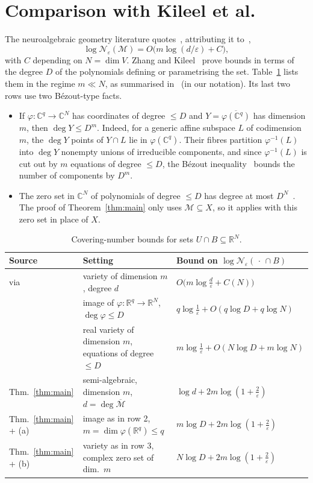 \documentclass[11pt]{article}
\newcommand{\R}{\mathbb{R}}
\newcommand{\C}{\mathbb{C}}
\newcommand{\cM}{\mathcal{M}}
\newcommand{\cN}{\mathcal{N}}
\begin{document}
\section{Comparison with Kileel et al.}

The neuroalgebraic geometry literature quotes~\cite[eq.~(4)]{MSMTK25},
attributing it to~\cite{KTB19},
\[
  \log\cN_\varepsilon(\cM)=O\bigl(m\log(d/\varepsilon)+C\bigr),
\]
with $C$ depending on $N=\dim V$. Zhang and Kileel~\cite{ZK23} prove bounds in
terms of the degree $D$ of the polynomials defining or parametrising the set.
Table~\ref{tab:comparison} lists them in the regime $m\ll N$, as summarised
in~\cite[Table~1]{ZK23} (in our notation). Its last two rows use two
Bézout-type facts.


\begin{itemize}
\item[(a)] If $\varphi\colon\C^q\to\C^N$ has coordinates of degree $\le D$ and
  $Y=\overline{\varphi(\C^q)}$ has dimension $m$, then $\deg Y\le D^m$. Indeed,
  for a generic affine subspace $L$ of codimension $m$, the $\deg Y$ points of
  $Y\cap L$ lie in $\varphi(\C^q)$. Their fibres partition $\varphi^{-1}(L)$
  into $\deg Y$ nonempty unions of irreducible components, and since
  $\varphi^{-1}(L)$ is cut out by $m$ equations of degree $\le D$, the Bézout
  inequality~\cite{He83} bounds the number of components by $D^m$.
\item[(b)] The zero set in $\C^N$ of polynomials of degree $\le D$ has degree
  at most $D^N$~\cite{He83}. The proof of Theorem~\ref{thm:main} only uses
  $\cM\subseteq X$, so it applies with this zero set in place of $X$.
\end{itemize}

\begin{table}[ht]
\centering\small
\renewcommand{\arraystretch}{1.3}
\begin{tabular}{@{}lll@{}}
\toprule
Source & Setting & Bound on $\log\cN_\varepsilon(\,\cdot\,\cap B)$\\
\midrule
\cite{KTB19} via \cite{MSMTK25} & variety of dimension $m$, degree $d$
  & $O\bigl(m\log\frac{d}{\varepsilon}+C(N)\bigr)$\\
\cite{ZK23} & image of $\varphi\colon\R^q\to\R^N$, $\deg\varphi\le D$
  & $q\log\frac1\varepsilon+O(q\log D+q\log N)$\\
\cite{ZK23} & real variety of dimension $m$, equations of degree $\le D$
  & $m\log\frac1\varepsilon+O(N\log D+m\log N)$\\
\midrule
Thm.~\ref{thm:main} & semi-algebraic, dimension $m$, $d=\deg\overline{\cM}$
  & $\log d+2m\log(1+\frac{2}{\varepsilon})$\\
Thm.~\ref{thm:main} + (a) & image as in row 2, $m=\dim\varphi(\R^q)\le q$
  & $m\log D+2m\log(1+\frac{2}{\varepsilon})$\\
Thm.~\ref{thm:main} + (b) & variety as in row 3, complex zero set of dim.\ $m$
  & $N\log D+2m\log(1+\frac{2}{\varepsilon})$\\
\bottomrule
\end{tabular}
\caption{Covering-number bounds for sets $U\cap B\subseteq\R^N$.}
\label{tab:comparison}
\end{table}
\end{document}
